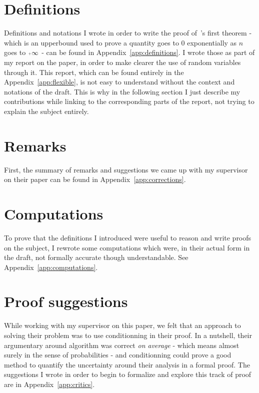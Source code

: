 \hypertarget{definitions}{\section{Definitions}}

\noindent
Definitions and notations I wrote in order
to write the proof of~\cite{langiu_speed_2018}'s first theorem - which
is an upperbound used to prove a quantity goes to 
0 exponentially as $n$ goes to $\pinf$ - can be found in Appendix~\ref{app:definitions}. 
I wrote those as part of my report on the paper, in order to make clearer the use 
of random variables through it. This report, which can be found entirely
in the Appendix~\ref{app:flexible}, is not easy to understand without the context and 
notations of the draft. This is why in the following section I just describe my contributions
while linking to the corresponding parts of the report, not trying to explain the subject 
entirely.


\section{Remarks}
First, the summary of remarks and suggestions we came up with
my supervisor on their paper can be found in Appendix~\ref{app:corrections}.

\hypertarget{computations}{\section{Computations}}
To prove that the definitions I introduced were useful to reason 
and write proofs on the subject, I rewrote some computations which
were, in their actual form in the draft, not formally accurate though
understandable. See Appendix~\ref{app:computations}.


\section{Proof suggestions}
\noindent
\hypertarget{critics}{}

While working with my supervisor on this paper, we felt that 
an approach to solving their problem was to use conditionning
in their proof. In a nutshell, their argumentary around 
algorithm was correct \emph{on average} - which means almost 
surely in the sense of probabilities 
- and conditionning could
prove a good method to quantify the uncertainty around their
analysis in a formal proof. The suggestions I wrote 
in order to begin to formalize and explore this track of proof 
are in Appendix~\ref{app:critics}.



